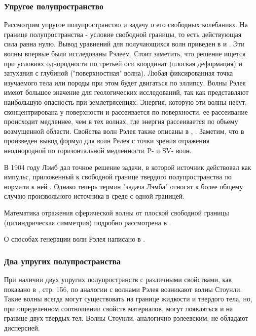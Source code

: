 \subsubsection{Упругое полупространство}

Рассмотрим упругое полупространство и задачу о его свободных колебаниях. На границе полупространства - условие свободной границы, то есть действующая сила равна нулю. Вывод уравнений для получающихся волн приведен в \cite{aki_richards} и \cite{viktorov}. Эти волны впервые были исследованы Рэлеем. Стоит заметить, что решение ищется при условиях однородности по третьей оси координат (плоская деформация) и затухания с глубиной ("поверхностная" волна). Любая фиксированная точка изучаемого тела или породы при этом будет двигаться по эллипсу. Волны Рэлея имеют большое значение для геологических исследований, так как представляют наибольшую опасность при землетрясениях. Энергия, которую эти волны несут, сконцентрирована у поверхности и рассеивается по поверхности, ее рассеивание происходит медленнее, чем в тех волнах, где энергия рассеивается по объему возмущенной области. Свойства волн Рэлея также описаны в \cite{aki_richards}, \cite{tischenko}. Заметим, что в \cite{aki_richards} произведен вывод формул для волн Релея с точки зрения отражения неоднородной по горизонтальной медленности P- и SV- волн.

В 1904 году Лэмб дал точное решение задачи, в которой источник действовал как импульс, приложенный к свободной границе твердого полупространства по нормали к ней \cite{lamb}. Однако теперь термин "задача Лэмба" относят к более общему случаю произвольного источника в среде с одной границей.

Математика отражения сферической волны от плоской свободной границы (цилиндрическая симметрия) подробно рассмотрена в \cite{aki_richards}.

О способах генерации волн Рэлея написано в \cite{viktorov}.


\subsubsection{Два упругих полупространства}

При наличии двух упругих полупространств с различными свойствами, как показано в \cite{aki_richards}, стр. 156, по аналогии с волнами Рэлея возникают волны Стоунли. Такие волны всегда могут существовать на границе жидкости и твердого тела, но, при определенном соотношении свойств материалов, могут появляться и на границе двух твердых тел. Волны Стоунли, аналогично рэлеевским, не обладают дисперсией.

